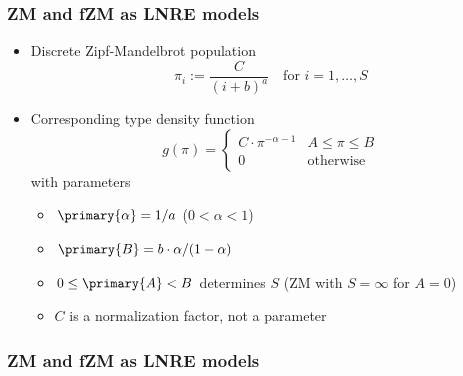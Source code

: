 \documentclass[t]{beamer} %
\begin{document}
\begin{frame}
  \frametitle{ZM and fZM as LNRE models}

  \begin{itemize}
  \item Discrete Zipf-Mandelbrot population
    \[
      \pi_i := \frac{C}{(i + b) ^ a} \quad \text{for } i = 1, \ldots, S
    \]
  \item<2-> Corresponding type density function \citep{Evert:04}
    \[
      g(\pi) =
      \begin{cases}
        C\cdot \pi^{-\alpha-1} & A \leq \pi \leq B\\
        0 & \text{otherwise}
      \end{cases}
    \]
    with parameters
    \begin{itemize}
    \item $\primary{\alpha} = 1 / a$ ($0 < \alpha < 1$)
    \item $\primary{B} = b \cdot \alpha / (1 - \alpha)$
    \item $0 \leq \primary{A} < B$ determines $S$ (ZM with $S = \infty$ for $A = 0$)
    \item[\hand] $C$ is a normalization factor, not a parameter
    \end{itemize}
  \end{itemize}
\end{frame}

\begin{frame}[c]
  \frametitle{ZM and fZM as LNRE models}

  \centering
\end{frame}
\end{document}
